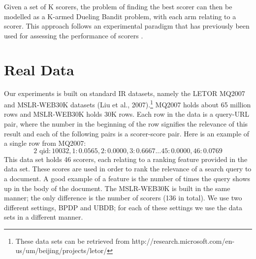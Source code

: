 \documentclass[MSc,beforeExam]{iitcsthesis}
\begin{document}
Given a set of K scorers, the problem of finding the best scorer can then be modelled as a K-armed Dueling Bandit problem, with each arm relating to a scorer.
This approach follows an experimental paradigm that has previously been used for assessing the performance of scorers \cite{radlinski2008does}.

\section{Real Data}
Our experiments is built on standard IR datasets, namely the LETOR MQ2007 and MSLR-WEB30K datasets (Liu et al., 2007).\footnote{These data sets can be retrieved from http://research.microsoft.com/en-us/um/beijing/projects/letor/}
MQ2007 holds about 65 million rows and MSLR-WEB30K holds 30K rows.
Each row in the data is a query-URL pair, where the number in the beginning of the row signifies the relevance of this result and each of the following pairs is a scorer-score pair.
Here is an example of a single row from MQ2007:
\begin{equation}\label{queri}
2 \text{ qid}:10032, 1:0.0565, 2:0.0000, 3:0.6667 ... 45:0.0000, 46:0.0769
\end{equation}
This data set holds 46 scorers, each relating to a ranking feature provided in the data set.
These scores are used in order to rank the relevance of a search query to a document. A good example of a feature is the number of times the query shows up in the body of the document. 
The MSLR-WEB30K is built in the same manner; the only difference is the number of scorers (136 in total).
We use two different settings, BPDP and UBDB; for each of these settings we use the data sets in a different manner.
\end{document}
